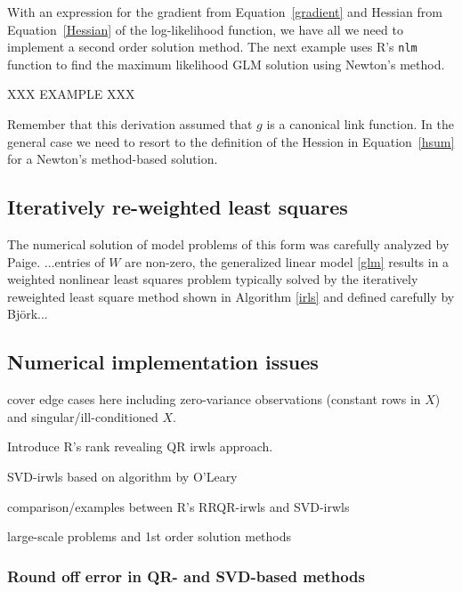 \documentclass[10pt]{article} %
\begin{document}
With an expression for the gradient from Equation~\ref{gradient} and Hessian
from Equation~\ref{Hessian} of the log-likelihood function, we have all we need
to implement a second order solution method. The next example uses R's
\verb+nlm+ function to find the maximum likelihood GLM solution using Newton's
method.

XXX EXAMPLE XXX

Remember that this derivation assumed that $g$ is a canonical link function. In
the general case we need to resort to the definition of the Hession in
Equation~\ref{hsum} for a Newton's method-based solution.



\subsection*{Iteratively re-weighted least squares}




The numerical solution of model problems of this form was carefully analyzed by
Paige\cite{paige}.
...entries of $W$ are non-zero, the generalized linear model
\ref{glm} results in a weighted nonlinear least squares problem
typically solved by the iteratively reweighted least square method
shown in Algorithm \ref{irls} and defined carefully by Bj\"ork\cite{bjork}...


\subsection*{Numerical implementation issues}

cover edge cases here including zero-variance observations (constant rows in $X$)
and singular/ill-conditioned $X$.

Introduce R's rank revealing QR irwls approach.

SVD-irwls based on algorithm by O'Leary

comparison/examples between R's RRQR-irwls and SVD-irwls

large-scale problems and 1st order solution methods


\subsubsection*{Round off error in QR- and SVD-based methods}
\end{document}
